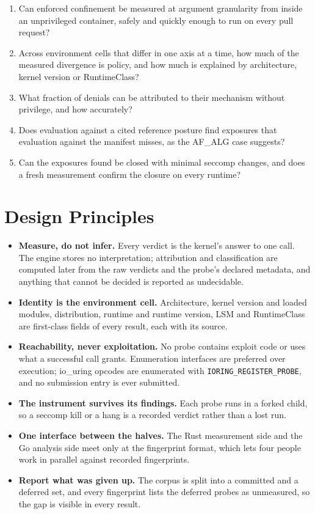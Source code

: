 \begin{enumerate}[label=\textbf{RQ\arabic*},leftmargin=*]
\item Can enforced confinement be measured at argument granularity from inside an unprivileged container, safely and quickly enough to run on every pull request?
\item Across environment cells that differ in one axis at a time, how much of the measured divergence is policy, and how much is explained by architecture, kernel version or RuntimeClass?
\item What fraction of denials can be attributed to their mechanism without privilege, and how accurately?
\item Does evaluation against a cited reference posture find exposures that evaluation against the manifest misses, as the AF\_ALG case suggests?
\item Can the exposures found be closed with minimal seccomp changes, and does a fresh measurement confirm the closure on every runtime?
\end{enumerate}

\section{Design Principles}

\begin{itemize}[leftmargin=*]
\item \textbf{Measure, do not infer.} Every verdict is the kernel's answer to one call. The engine stores no interpretation; attribution and classification are computed later from the raw verdicts and the probe's declared metadata, and anything that cannot be decided is reported as undecidable.
\item \textbf{Identity is the environment cell.} Architecture, kernel version and loaded modules, distribution, runtime and runtime version, LSM and RuntimeClass are first-class fields of every result, each with its source.
\item \textbf{Reachability, never exploitation.} No probe contains exploit code or uses what a successful call grants. Enumeration interfaces are preferred over execution; io\_uring opcodes are enumerated with \texttt{IORING\_REGISTER\_PROBE}, and no submission entry is ever submitted.
\item \textbf{The instrument survives its findings.} Each probe runs in a forked child, so a seccomp kill or a hang is a recorded verdict rather than a lost run.
\item \textbf{One interface between the halves.} The Rust measurement side and the Go analysis side meet only at the fingerprint format, which lets four people work in parallel against recorded fingerprints.
\item \textbf{Report what was given up.} The corpus is split into a committed and a deferred set, and every fingerprint lists the deferred probes as unmeasured, so the gap is visible in every result.
\end{itemize}


